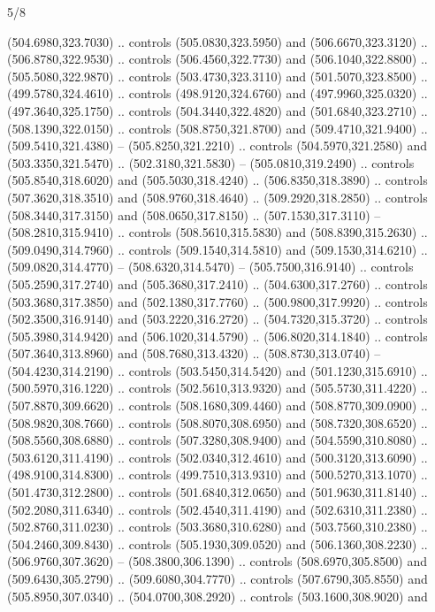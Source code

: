 \begin{flagdescription}{5/8}
\begin{scope}[xshift=0.5\flaglength,yshift=0.5\flagwidth,scale=\flagwidth/475.63]
\begin{scope}[y=0.8pt, x=0.8pt, yscale=-1, xscale=1,shift={(-450,-300)}]
\begin{scope}[cm={{1.0,0.0,0.0,1.0,(-0.0002,0.12556)}},cm={{1.0,0.0,0.0,1.0,(0.00179,0.0)}}]
  (504.6980,323.7030) .. controls (505.0830,323.5950) and (506.6670,323.3120) ..
  (506.8780,322.9530) .. controls (506.4560,322.7730) and (506.1040,322.8800) ..
  (505.5080,322.9870) .. controls (503.4730,323.3110) and (501.5070,323.8500) ..
  (499.5780,324.4610) .. controls (498.9120,324.6760) and (497.9960,325.0320) ..
  (497.3640,325.1750) .. controls (504.3440,322.4820) and (501.6840,323.2710) ..
  (508.1390,322.0150) .. controls (508.8750,321.8700) and (509.4710,321.9400) ..
  (509.5410,321.4380) -- (505.8250,321.2210) .. controls (504.5970,321.2580) and
  (503.3350,321.5470) .. (502.3180,321.5830) -- (505.0810,319.2490) .. controls
  (505.8540,318.6020) and (505.5030,318.4240) .. (506.8350,318.3890) .. controls
  (507.3620,318.3510) and (508.9760,318.4640) .. (509.2920,318.2850) .. controls
  (508.3440,317.3150) and (508.0650,317.8150) .. (507.1530,317.3110) --
  (508.2810,315.9410) .. controls (508.5610,315.5830) and (508.8390,315.2630) ..
  (509.0490,314.7960) .. controls (509.1540,314.5810) and (509.1530,314.6210) ..
  (509.0820,314.4770) -- (508.6320,314.5470) -- (505.7500,316.9140) .. controls
  (505.2590,317.2740) and (505.3680,317.2410) .. (504.6300,317.2760) .. controls
  (503.3680,317.3850) and (502.1380,317.7760) .. (500.9800,317.9920) .. controls
  (502.3500,316.9140) and (503.2220,316.2720) .. (504.7320,315.3720) .. controls
  (505.3980,314.9420) and (506.1020,314.5790) .. (506.8020,314.1840) .. controls
  (507.3640,313.8960) and (508.7680,313.4320) .. (508.8730,313.0740) --
  (504.4230,314.2190) .. controls (503.5450,314.5420) and (501.1230,315.6910) ..
  (500.5970,316.1220) .. controls (502.5610,313.9320) and (505.5730,311.4220) ..
  (507.8870,309.6620) .. controls (508.1680,309.4460) and (508.8770,309.0900) ..
  (508.9820,308.7660) .. controls (508.8070,308.6950) and (508.7320,308.6520) ..
  (508.5560,308.6880) .. controls (507.3280,308.9400) and (504.5590,310.8080) ..
  (503.6120,311.4190) .. controls (502.0340,312.4610) and (500.3120,313.6090) ..
  (498.9100,314.8300) .. controls (499.7510,313.9310) and (500.5270,313.1070) ..
  (501.4730,312.2800) .. controls (501.6840,312.0650) and (501.9630,311.8140) ..
  (502.2080,311.6340) .. controls (502.4540,311.4190) and (502.6310,311.2380) ..
  (502.8760,311.0230) .. controls (503.3680,310.6280) and (503.7560,310.2380) ..
  (504.2460,309.8430) .. controls (505.1930,309.0520) and (506.1360,308.2230) ..
  (506.9760,307.3620) -- (508.3800,306.1390) .. controls (508.6970,305.8500) and
  (509.6430,305.2790) .. (509.6080,304.7770) .. controls (507.6790,305.8550) and
  (505.8950,307.0340) .. (504.0700,308.2920) .. controls (503.1600,308.9020) and

\end{scope}
\end{scope}
\end{scope}
\end{flagdescription}
